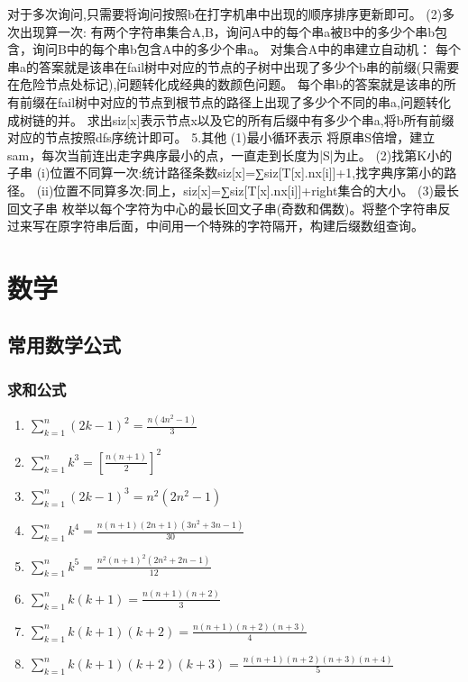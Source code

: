\documentclass[landscape,twocolumn,a4paper]{article}
\begin{document}
	对于多次询问,只需要将询问按照b在打字机串中出现的顺序排序更新即可。
	(2)多次出现算一次:
	有两个字符串集合A,B，询问A中的每个串a被B中的多少个串b包含，询问B中的每个串b包含A中的多少个串a。
	对集合A中的串建立自动机：
	每个串a的答案就是该串在fail树中对应的节点的子树中出现了多少个b串的前缀(只需要在危险节点处标记),问题转化成经典的数颜色问题。
	每个串b的答案就是该串的所有前缀在fail树中对应的节点到根节点的路径上出现了多少个不同的串a,问题转化成树链的并。
	求出siz[x]表示节点x以及它的所有后缀中有多少个串a,将b所有前缀对应的节点按照dfs序统计即可。
	5.其他
	(1)最小循环表示
	将原串S倍增，建立sam，每次当前连出走字典序最小的点，一直走到长度为|S|为止。
	(2)找第K小的子串
	(i)位置不同算一次:统计路径条数siz[x]=∑siz[T[x].nx[i]]+1,找字典序第小的路径。
	(ii)位置不同算多次:同上，siz[x]=∑siz[T[x].nx[i]]+right集合的大小。
	(3)最长回文子串
	枚举以每个字符为中心的最长回文子串(奇数和偶数)。将整个字符串反过来写在原字符串后面，中间用一个特殊的字符隔开，构建后缀数组查询。



\section{数学}

\subsection{常用数学公式}

	\subsubsection*{求和公式}

	\begin{enumerate}
		\item $\sum_{k=1}^{n}(2k-1)^2 = \frac{n(4n^2-1)}{3}	$
		\item $\sum_{k=1}^{n}k^3 = [\frac{n(n+1)}{2}]^2	$
		\item $\sum_{k=1}^{n}(2k-1)^3 = n^2(2n^2-1)	$
		\item $\sum_{k=1}^{n}k^4 = \frac{n(n+1)(2n+1)(3n^2+3n-1)}{30}  $
		\item $\sum_{k=1}^{n}k^5 = \frac{n^2(n+1)^2(2n^2+2n-1)}{12}	$
		\item $\sum_{k=1}^{n}k(k+1) = \frac{n(n+1)(n+2)}{3}	$
		\item $\sum_{k=1}^{n}k(k+1)(k+2) = \frac{n(n+1)(n+2)(n+3)}{4} $
		\item $\sum_{k=1}^{n}k(k+1)(k+2)(k+3) = \frac{n(n+1)(n+2)(n+3)(n+4)}{5} $
	\end{enumerate}
\end{document}
